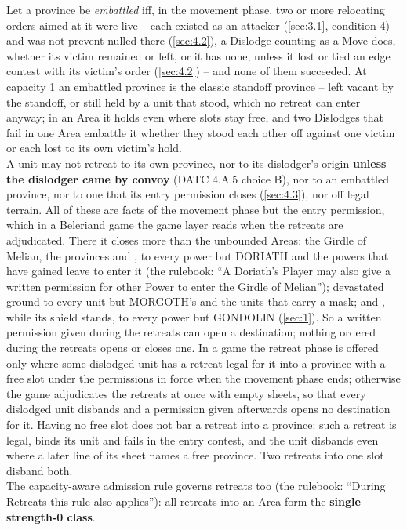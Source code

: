 \documentclass[12pt,a4paper]{article}
\begin{document}
Let a province be \emph{embattled} iff, in the movement phase, two or more relocating orders aimed at it were live -- each existed as an attacker (\cref{sec:3.1}, condition 4) and was not prevent-nulled there (\cref{sec:4.2}), a Dislodge counting as a Move does, whether its victim remained or left, or it has none, unless it lost or tied an edge contest with its victim's order (\cref{sec:4.2}) -- and none of them succeeded.
At capacity 1 an embattled province is the classic standoff province -- left vacant by the standoff, or still held by a unit that stood, which no retreat can enter anyway; in an Area it holds even where slots stay free, and two Dislodges that fail in one Area embattle it whether they stood each other off against one victim or each lost to its own victim's hold.\\
A unit may not retreat to its own province, nor to its dislodger's origin \textbf{unless the dislodger came by convoy} (DATC 4.A.5 choice B), nor to an embattled province, nor to one that its entry permission closes (\cref{sec:4.3}), nor off legal terrain.
All of these are facts of the movement phase but the entry permission, which in a Beleriand game the game layer reads when the retreats are adjudicated.
There it closes more than the unbounded Areas: the Girdle of Melian, the provinces  and , to every power but DORIATH and the powers that have gained leave to enter it (the rulebook: ``A Doriath's Player may also give a written permission for other Power to enter the Girdle of Melian''); devastated ground to every unit but MORGOTH's and the units that carry a mask; and , while its shield stands, to every power but GONDOLIN (\cref{sec:1}).
So a written permission given during the retreats can open a destination; nothing ordered during the retreats opens or closes one.
In a game the retreat phase is offered only where some dislodged unit has a retreat legal for it into a province with a free slot under the permissions in force when the movement phase ends; otherwise the game adjudicates the retreats at once with empty sheets, so that every dislodged unit disbands and a permission given afterwards opens no destination for it.
Having no free slot does not bar a retreat into a province: such a retreat is legal, binds its unit and fails in the entry contest, and the unit disbands even where a later line of its sheet names a free province.
Two retreats into one slot disband both.\\
The capacity-aware admission rule governs retreats too (the rulebook: ``During Retreats this rule also applies''): all retreats into an Area form the \textbf{single strength-0 class}.
\end{document}
